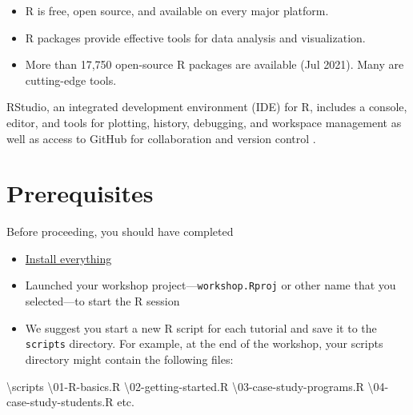 \documentclass[
]{book}
\newenvironment{Shaded}{\begin{snugshade}}{\end{snugshade}}
\newcommand{\DecValTok}[1]{\textcolor[rgb]{0.00,0.00,0.81}{#1}}
\newcommand{\NormalTok}[1]{#1}
\newcommand{\SpecialCharTok}[1]{\textcolor[rgb]{0.00,0.00,0.00}{#1}}
\providecommand{\tightlist}{%
  \setlength{\itemsep}{0pt}\setlength{\parskip}{0pt}}
\begin{document}
\begin{itemize}
\tightlist
\item
  R is free, open source, and available on every major platform.
\item
  R packages provide effective tools for data analysis and visualization.
\item
  More than 17,750 open-source R packages are available (Jul 2021). Many are cutting-edge tools.
\end{itemize}

RStudio, an integrated development environment (IDE) for R, includes a console, editor, and tools for plotting, history, debugging, and workspace management as well as access to GitHub for collaboration and version control \citep{2016rstudio}.

\hypertarget{prerequisites}{%
\section{Prerequisites}\label{prerequisites}}

Before proceeding, you should have completed

\begin{itemize}
\tightlist
\item
  \protect\hyperlink{install-everything}{Install everything}\\
\item
  Launched your workshop project---\texttt{workshop.Rproj} or other name that you selected---to start the R session\\
\item
  We suggest you start a new R script for each tutorial and save it to the \texttt{scripts} directory. For example, at the end of the workshop, your scripts directory might contain the following files:
\end{itemize}

\begin{Shaded}
\begin{Highlighting}[]
\NormalTok{        \textbackslash{}scripts    }
\NormalTok{            \textbackslash{}}\DecValTok{01}\SpecialCharTok{{-}}\NormalTok{R}\SpecialCharTok{{-}}\NormalTok{basics.R    }
\NormalTok{            \textbackslash{}}\DecValTok{02}\SpecialCharTok{{-}}\NormalTok{getting}\SpecialCharTok{{-}}\NormalTok{started.R    }
\NormalTok{            \textbackslash{}}\DecValTok{03}\SpecialCharTok{{-}}\NormalTok{case}\SpecialCharTok{{-}}\NormalTok{study}\SpecialCharTok{{-}}\NormalTok{programs.R    }
\NormalTok{            \textbackslash{}}\DecValTok{04}\SpecialCharTok{{-}}\NormalTok{case}\SpecialCharTok{{-}}\NormalTok{study}\SpecialCharTok{{-}}\NormalTok{students.R     }
\NormalTok{            etc.  }
\end{Highlighting}
\end{Shaded}
\end{document}
